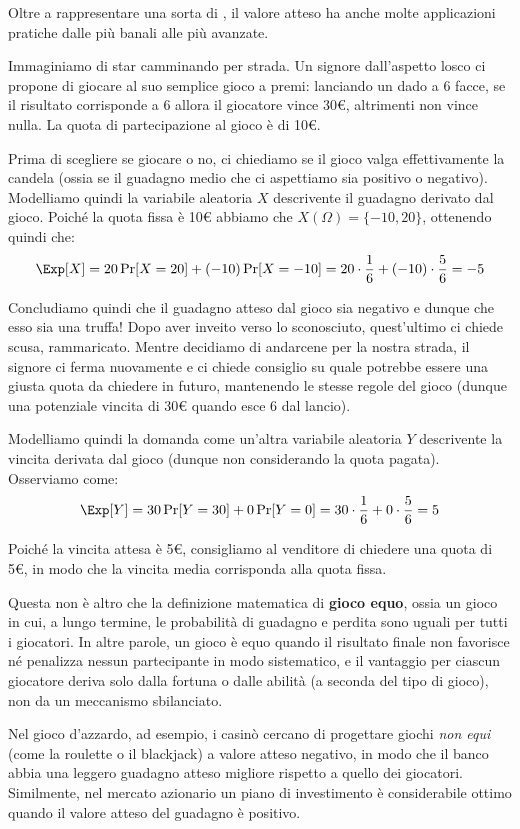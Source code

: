 \documentclass[a4paper, 12pt]{report}
\begin{document}
    Oltre a rappresentare una sorta di , il valore atteso ha anche molte applicazioni pratiche dalle più banali alle più avanzate.
    
    Immaginiamo di star camminando per strada. Un signore dall'aspetto losco ci propone di giocare al suo semplice gioco a premi: lanciando un dado a 6 facce, se il risultato corrisponde a 6 allora il giocatore vince 30€, altrimenti non vince nulla. La quota di partecipazione al gioco è di 10€.

    Prima di scegliere se giocare o no, ci chiediamo se il gioco valga effettivamente la candela (ossia se il guadagno medio che ci aspettiamo sia positivo o negativo). Modelliamo quindi la variabile aleatoria $X$ descrivente il guadagno derivato dal gioco. Poiché la quota fissa è 10€ abbiamo che $X(\Omega) = \{-10, 20\}$, ottenendo quindi che:
    \[\Exp[X] = 20 \Pr[X = 20] + (-10) \Pr[X = -10] = 20 \cdot \frac{1}{6} + (-10) \cdot \frac{5}{6} = -5\]

    Concludiamo quindi che il guadagno atteso dal gioco sia negativo e dunque che esso sia una truffa! Dopo aver inveito verso lo sconosciuto, quest'ultimo ci chiede scusa, rammaricato. Mentre decidiamo di andarcene per la nostra strada, il signore ci ferma nuovamente e ci chiede consiglio su quale potrebbe essere una giusta quota da chiedere in futuro, mantenendo le stesse regole del gioco (dunque una potenziale vincita di 30€ quando esce 6 dal lancio).
    
    Modelliamo quindi la domanda come un'altra variabile aleatoria $Y$ descrivente la vincita derivata dal gioco (dunque non considerando la quota pagata). Osserviamo come:
    \[\Exp[Y] = 30 \Pr[Y = 30] + 0 \Pr[Y = 0] = 30 \cdot \frac{1}{6} + 0 \cdot \frac{5}{6} = 5\]

    Poiché la vincita attesa è 5€, consigliamo al venditore di chiedere una quota di 5€, in modo che la vincita media corrisponda alla quota fissa.
    
    Questa non è altro che la definizione matematica di \textbf{gioco equo}, ossia un gioco in cui, a lungo termine, le probabilità di guadagno e perdita sono uguali per tutti i giocatori. In altre parole, un gioco è equo quando il risultato finale non favorisce né penalizza nessun partecipante in modo sistematico, e il vantaggio per ciascun giocatore deriva solo dalla fortuna o dalle abilità (a seconda del tipo di gioco), non da un meccanismo sbilanciato.
    
    Nel gioco d'azzardo, ad esempio, i casinò cercano di progettare giochi \textit{non equi} (come la roulette o il blackjack) a valore atteso negativo, in modo che il banco abbia una leggero guadagno atteso migliore rispetto a quello dei giocatori. Similmente, nel mercato azionario un piano di investimento è considerabile ottimo quando il valore atteso del guadagno è positivo.
\end{document}
